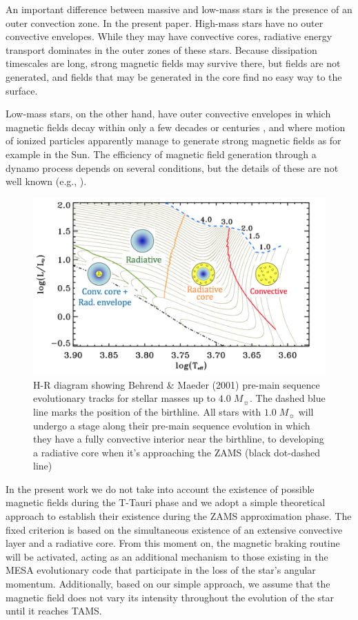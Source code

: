 \documentclass[fleqn,usenatbib]{mnras}
\begin{document}
An important difference between massive and low-mass stars is the presence of an outer convection zone. In the present paper. High-mass stars have no outer convective envelopes. While they may have convective cores, radiative energy transport dominates in the outer zones of these stars. Because dissipation timescales are long, strong magnetic fields may survive there, but fields are not generated, and fields that may be generated in the core find no easy way to the surface.\par

Low-mass stars, on the other hand, have outer convective envelopes in which magnetic fields decay within only a few decades or centuries \citep{Chabrier2006}, and where motion of ionized particles apparently manage to generate strong magnetic fields as for example in the Sun. The efficiency of magnetic field generation through a dynamo process depends on several conditions, but the details of these are not well known (e.g., \citet{Charbonneau2010}). \par

\begin{figure}
	\includegraphics[width=\columnwidth]{figures/hussain_gaitee_fig1.png}
    \caption{H-R diagram showing Behrend \& Maeder (2001) pre-main sequence evolutionary tracks for stellar masses up to $4.0 \; M_{\sun}$. The dashed blue line marks the position of the birthline. All stars with $1.0 \; M_{\sun}$ will undergo a stage along their pre-main sequence evolution in which they have a fully convective interior near the birthline, to developing a radiative core when it's approaching the ZAMS (black dot-dashed line) \citet{Hussain2014}}
    \label{fig:hr_hussain}
\end{figure}


In the present work we do not take into account the existence of possible magnetic fields during the T-Tauri phase and we adopt a simple theoretical approach to establish their existence during the ZAMS approximation phase. The fixed criterion is based on the simultaneous existence of an extensive convective layer and a radiative core. From this moment on, the magnetic braking routine will be activated, acting as an additional mechanism to those existing in the MESA evolutionary code that participate in the loss of the star's angular momentum. Additionally, based on our simple approach, we assume that the magnetic field does not vary its intensity throughout the evolution of the star until it reaches TAMS.\par
\end{document}
